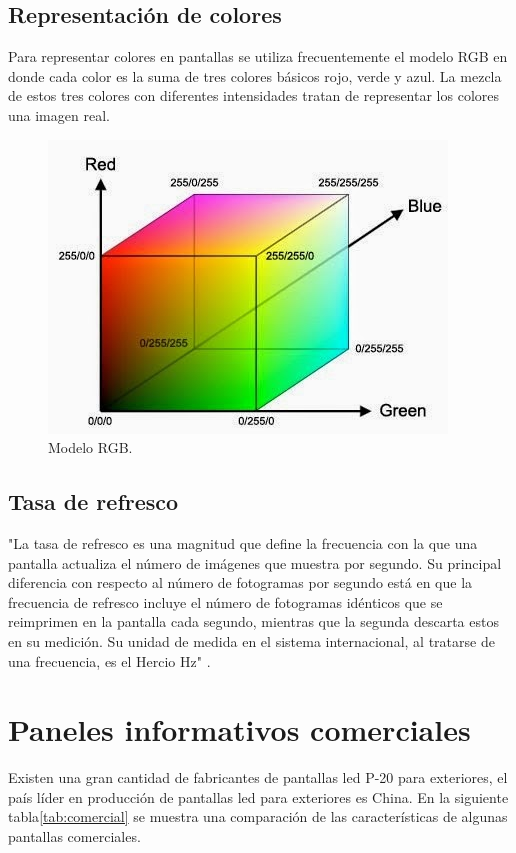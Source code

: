 \subsection{Representación de colores}
Para representar colores en pantallas se utiliza frecuentemente el modelo RGB en donde cada color es la suma de tres colores básicos rojo, verde y azul. La mezcla de estos tres colores con diferentes intensidades tratan de representar los colores una imagen real.
\begin{figure}[htpb]
	\centering
	\includegraphics[scale=0.6]{Figures/modelorgb.jpg} 
	\caption{Modelo RGB\protect\footnotemark.}
	\label{fig:grafrgb}
\end{figure}

\subsection{Tasa de refresco}
"La tasa de refresco es una magnitud que define la frecuencia con la que una pantalla actualiza el número de imágenes que muestra por segundo. Su principal diferencia con respecto al número de fotogramas por segundo está en que la frecuencia de refresco incluye el número de fotogramas idénticos que se reimprimen en la pantalla cada segundo, mientras que la segunda descarta estos en su medición. Su unidad de medida en el sistema internacional, al tratarse de una frecuencia, es el Hercio Hz" \citep{WIKITASA}.




\section{Paneles informativos comerciales}
Existen una gran cantidad de fabricantes de pantallas led P-20 para exteriores, el país líder en producción de pantallas led para exteriores es China. En la siguiente tabla\ref{tab:comercial} se muestra una comparación de las características de algunas pantallas comerciales.




